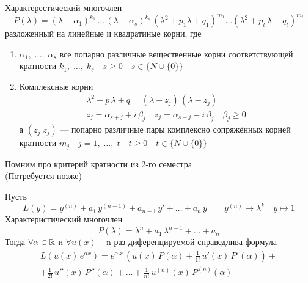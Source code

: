 \begin{Note}[Напоминание] Характерестический многочлен
    \[
        P(\lambda)=(\lambda-\alpha_1)^{k_1}\,\dots\,(\lambda-\alpha_s)^{k_s}\,(\lambda^2+p_1 \lambda+q_1)^{m_1}\dots(\lambda^2+p_t\, \lambda+q_t)^{m_t}
    \]
    разложенный на линейные и квадратиные корни, где
    \begin{enumerate}
        \item $\alpha_1,\; \dots,\; \alpha_s$ все попарно различные вещественные корни соответствующей кратности $k_1,\; \dots,\; k_s \quad s \geqslant 0 \quad s \in \{N \cup \{0\}\}$
        
        \item Комплексные корни 
        \begin{gather*}
            \lambda^2+p\,\lambda+q=(\lambda-z_j)\,(\lambda-\bar{z_j})\\
            z_j = \alpha_{s + j} + i\,\beta_j \quad \bar{z_j} = \alpha_{s + j} - i\,\beta_j \quad \beta_j \geqslant 0
        \end{gather*}
        а $(z_j\; \bar{z_j})$ --- попарно различные пары комплексно сопряжённых корней кратности $m_j \quad j=1,\; \dots,\; t \quad t \geqslant 0 \quad t \in \{N \cup \{0\}\}$
    \end{enumerate}
\end{Note}

\begin{Note}
    Помним про критерий кратности из 2-го семестра\\
    (Потребуется позже) 
\end{Note}

\begin{Lem}
    Пусть 
    \[
        L(y)=y^{(n)}+a_1\,y^{(n-1)}+a_{n-1}\,y'+\dots+a_n\,y \qquad y^{(n)} \mapsto \lambda^k \quad y \mapsto 1
    \]
    Характеристический многочлен
    \[
        P(\lambda)= \lambda^n + a_1\,\lambda^{n-1} + \dots + a_n
    \]
    Тогда $\forall \alpha \in \mathbb{R}$ и $\forall u(x)$ -- n раз диференцируемой справедлива формула 
    \begin{multline*}
        L(u(x)\,e^{\alpha x})=e^{\alpha\,x}\, (u(x)\,P(\alpha)+\frac{1}{1!}\,u'(x)\,P'(\alpha))+\\ +\frac{1}{2!}\,u''(x)\,P''(\alpha)+ \dots +\frac{1}{n!}\,u^{(n)}(x)\,P^{(n)}(\alpha)
    \end{multline*}
\end{Lem}

